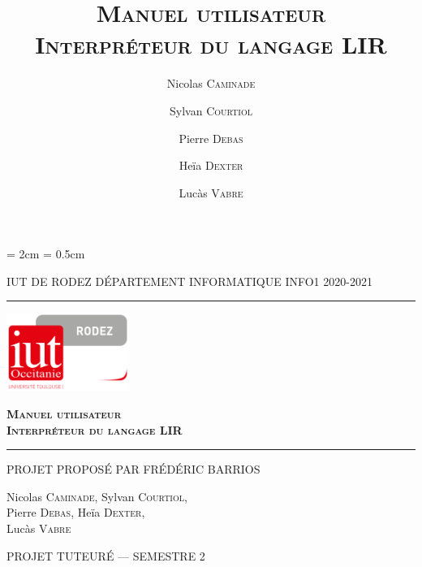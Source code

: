 \documentclass[11pt,a4paper,titlepage,openany]{book}
\title{\textsc{\textbf{Manuel utilisateur\\Interpréteur du langage LIR}}}
\date{}
\author{Nicolas \textsc{Caminade} \and
        Sylvan \textsc{Courtiol} \and
        Pierre \textsc{Debas} \and
        Heïa \textsc{Dexter} \and
        Lucàs \textsc{Vabre} }
\begin{document}
    \renewcommand\sfdefault{pag}

    \lhead{\leftmark}

    \cfoot{\thepage}
    \headheight = 2cm
    \headsep = 0.5cm

    \begin{titlepage}
        \selectfont

        \begin{center}\normalsize
            \MakeUppercase{IUT de Rodez \hfill Département informatique
                \hfill INFO1 2020-2021}
        \end{center}
        \vspace*{0.1cm}
        \hrule
        \vspace*{0.2cm}
        \begin{flushright}
            \includegraphics[width=4cm]{img/logoiut}
        \end{flushright}
        \vspace*{2cm}
        \begin{flushright}\Huge
            \textsc{\textbf{Manuel utilisateur\\Interpréteur du langage LIR}}
        \end{flushright}
        \hrule
        \begin{flushleft}
            \MakeUppercase{Projet proposé par Frédéric Barrios}
        \end{flushleft}
        \vspace*{2cm}
        \begin{center}\Large
            Nicolas \textsc{Caminade}, Sylvan \textsc{Courtiol},\\
            Pierre \textsc{Debas}, Heïa \textsc{Dexter}, \\
            Lucàs \textsc{Vabre}
        \end{center}
        \vfill
        \begin{center}\normalsize
            \MakeUppercase{Projet tuteuré --- Semestre 2}
        \end{center}
    \end{titlepage}
\end{document}
